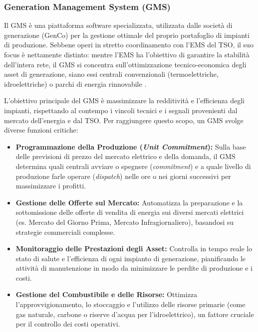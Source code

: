\subsubsection{Generation Management System (GMS)}




Il GMS è una piattaforma software specializzata, utilizzata dalle società di generazione (GenCo) per la gestione ottimale del proprio portafoglio di impianti di produzione. Sebbene operi in stretto coordinamento con l'EMS del TSO, il suo focus è nettamente distinto: mentre l'EMS ha l'obiettivo di garantire la stabilità dell'intera rete, il GMS si concentra sull'ottimizzazione tecnico-economica degli asset di generazione, siano essi centrali convenzionali (termoelettriche, idroelettriche) o parchi di energia rinnovabile \cite{GMS-hitachi}.

L'obiettivo principale del GMS è massimizzare la redditività e l'efficienza degli impianti, rispettando al contempo i vincoli tecnici e i segnali provenienti dal mercato dell'energia e dal TSO. Per raggiungere questo scopo, un GMS svolge diverse funzioni critiche:

\begin{itemize}
    \item \textbf{Programmazione della Produzione (\textit{Unit Commitment}): }Sulla base delle previsioni di prezzo del mercato elettrico e della domanda, il GMS determina quali centrali avviare o spegnere (\textit{commitment}) e a quale livello di produzione farle operare (\textit{dispatch}) nelle ore o nei giorni successivi per massimizzare i profitti.
    \item \textbf{Gestione delle Offerte sul Mercato:} Automatizza la preparazione e la sottomissione delle offerte di vendita di energia sui diversi mercati elettrici (es. Mercato del Giorno Prima, Mercato Infragiornaliero), basandosi su strategie commerciali complesse.
    \item \textbf{Monitoraggio delle Prestazioni degli Asset:} Controlla in tempo reale lo stato di salute e l'efficienza di ogni impianto di generazione, pianificando le attività di manutenzione in modo da minimizzare le perdite di produzione e i costi.
    \item \textbf{Gestione del Combustibile e delle Risorse:} Ottimizza l'approvvigionamento, lo stoccaggio e l'utilizzo delle risorse primarie (come gas naturale, carbone o riserve d'acqua per l'idroelettrico), un fattore cruciale per il controllo dei costi operativi.
\end{itemize}


